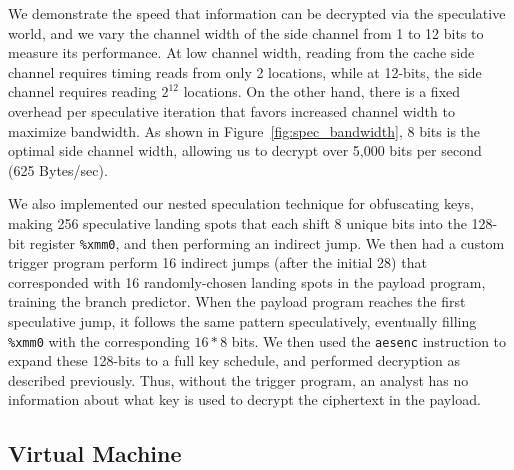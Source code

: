 We demonstrate the speed that information can be decrypted via the speculative
world, and we vary the channel width of the side channel from 1 to 12 bits to
measure its performance. At low channel width, reading from the cache side
channel requires timing reads from only 2 locations, while at 12-bits, the side
channel requires reading $2^{12}$ locations. On the other hand, there is a fixed
overhead per speculative iteration that favors increased channel width to maximize
bandwidth. As shown in Figure~\ref{fig:spec_bandwidth}, 8 bits is the optimal
side channel width, allowing us to decrypt over 5,000 bits per second (625
Bytes/sec).


\smallskip

We also implemented our nested speculation technique for obfuscating keys,
making 256 speculative landing spots that each
shift 8 unique bits into the 128-bit register \texttt{\%xmm0}, and then
performing an indirect jump. We then had a custom trigger program perform 16
indirect jumps (after the initial 28) that corresponded with 16 randomly-chosen landing spots in the
payload program, training the branch predictor. When the payload program reaches the
first speculative jump, it follows the same pattern speculatively, 
eventually filling
\texttt{\%xmm0} with the corresponding $16*8$ bits. We then used
the \texttt{aesenc} instruction to expand these 128-bits to a full
key schedule, and performed decryption as described previously. Thus, without
the trigger program, an analyst has no information about what key is used to
decrypt the ciphertext in the payload.




\FigSpecBandwidth

\subsection{Virtual Machine}
\label{subsec:spasm}



